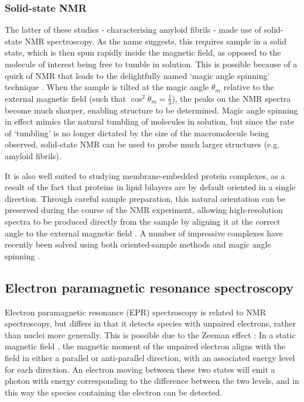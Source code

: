 \documentclass[a4paper,11pt,twoside,openright]{scrbook}
\begin{document}
\subsubsection{Solid-state NMR}
The latter of these studies - characterising amyloid fibrils - made use of
solid-state NMR spectroscopy. As the name suggests, this requires sample in a
solid state, which is then spun rapidly inside the magnetic field, as opposed to
the molecule of interest being free to tumble in solution. This is possible
because of a quirk of NMR that leads to the delightfully named `magic angle
spinning' technique \cite{Andrew1958,Lowe1959}. When the sample is tilted at the
magic angle $\theta_{m}$ relative to the external magnetic field (such that
$\cos^{2}\theta_{m} = \frac{1}{3}$), the peaks on the NMR spectra become much
sharper, enabling structure to be determined. Magic angle spinning in effect
mimics the natural tumbling of molecules in solution, but since the rate of
`tumbling' is no longer dictated by the size of the macromolecule being
observed, solid-state NMR can be used to probe much larger structures (e.g.
amyloid fibrils).

It is also well suited to studying membrane-embedded protein complexes, as a
result of the fact that proteins in lipid bilayers are by default oriented in a
single direction. Through careful sample preparation, this natural orientation
can be preserved during the course of the NMR experiment, allowing
high-resolution spectra to be produced directly from the sample by aligning it
at the correct angle to the external magnetic field \cite{Hansen2015}. A number
of impressive complexes have recently been solved using both oriented-sample
methods and magic angle spinning \cite{Loquet2012,Kaplan2015,Huang2017}.

\subsection{Electron paramagnetic resonance spectroscopy}
Electron paramagnetic resonance (EPR) spectroscopy is related to NMR
spectroscopy, but differs in that it detects species with unpaired electrons,
rather than nuclei more generally. This is possible due to the Zeeman effect
\cite{Zeeman1897}: In a static magnetic field , the magnetic moment of
the unpaired electron aligns with the field in either a parallel or
anti-parallel direction, with an associated energy level for each direction. An
electron moving between these two states will emit a photon with energy
corresponding to the difference between the two levels, and in this way the
species containing the electron can be detected.
\end{document}
